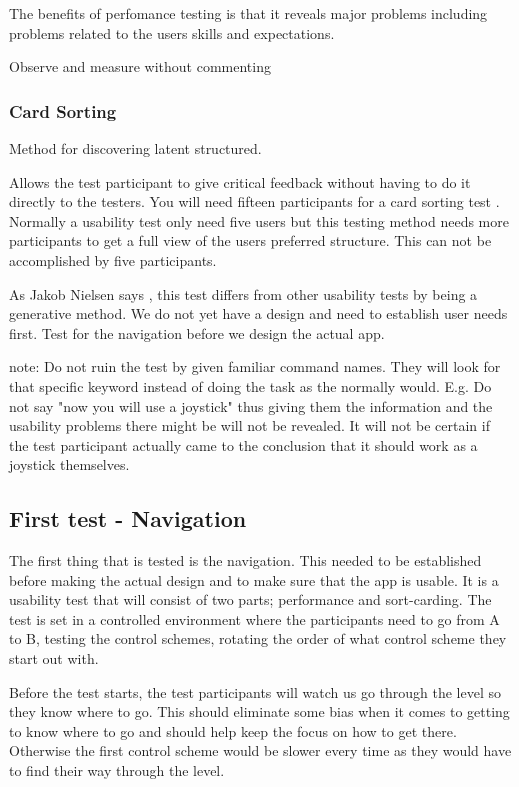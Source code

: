 The benefits of perfomance testing is that it reveals major problems including problems related to the users skills and expectations. \cite{performance}

Observe and measure without commenting\cite{}

\subsubsection{Card Sorting}
Method for discovering latent structured. \cite{cards}

Allows the test participant to give critical feedback without having to do it directly to the testers. 
You will need fifteen participants for a card sorting test \cite{cardSorting}. Normally a usability test only need five users but this testing method needs more participants to get a full view of the users preferred structure. This can not be accomplished by five participants. \cite{cardSorting}

As Jakob Nielsen says \cite{cardSorting}, this test differs from other usability tests by being a generative method. 
We do not yet have a design and need to establish user needs first. Test for the navigation before we design the actual app. 

note: Do not ruin the test by given familiar command names. They will look for that specific keyword instead of doing the task 
as the normally would. \cite{}
E.g. Do not say "now you will use a joystick" thus giving them the information and the usability problems there might be
will not be revealed. It will not be certain if the test participant actually came to the conclusion that it should work as a joystick
themselves. 

\subsection{First test - Navigation}

The first thing that is tested is the navigation. This needed to be established before making the actual design and to make sure that the app is usable.
It is a usability test that will consist of two parts; performance and sort-carding. 
The test is set in a controlled environment where the participants need to go from A to B, testing the control schemes, rotating the order of what control scheme they start out with.

Before the test starts, the test participants will watch us go through the level so they know where to go. This should eliminate some bias when it comes to getting to know where to go and should help keep the focus on how to get there. Otherwise the first control scheme would be slower every time as they would have to find their way through the level.

